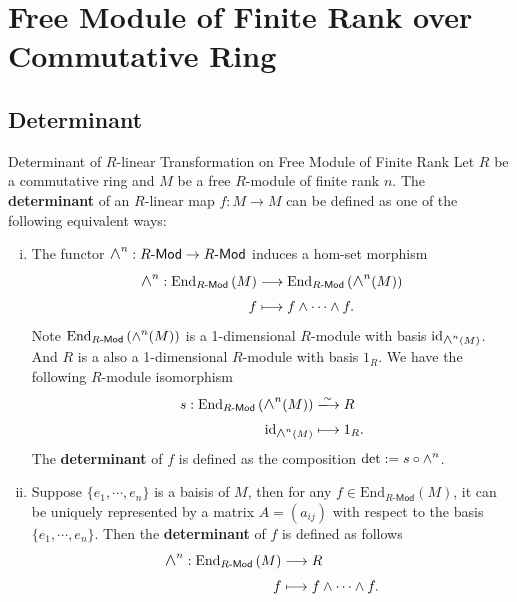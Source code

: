 \section{Free Module of Finite Rank over Commutative Ring}
\subsection{Determinant}

\begin{definition}{Determinant of $R$-linear Transformation on Free Module of Finite Rank}{}
    Let $R$ be a commutative ring and $M$ be a free $R$-module of finite rank $n$. The \textbf{determinant} of an $R$-linear map $f:M\to M$ can be defined as one of the following equivalent ways:
    \begin{enumerate}[(i)]
        \item The functor $\Largewedge^n:R\text{-}\mathsf{Mod}\to R\text{-}\mathsf{Mod}$ induces a hom-set morphism 
        \begin{align*}
            \largewedge^n:\mathrm{End}_{R\text{-}\mathsf{Mod}}\left(M\right) &\longrightarrow\mathrm{End}_{R\text{-}\mathsf{Mod}}\left(\largewedge^n(M)\right)\\
        f &\longmapsto f\wedge\cdots\wedge f.
        \end{align*}
        Note $\mathrm{End}_{R\text{-}\mathsf{Mod}}\left(\largewedge^n(M)\right)$ is a 1-dimensional $R$-module with basis $\mathrm{id}_{\largewedge^n(M)}$. And $R$ is a also a 1-dimensional $R$-module with basis $1_R$. We have the following $R$-module isomorphism
        \begin{align*}
            s:\mathrm{End}_{R\text{-}\mathsf{Mod}}\left(\largewedge^n(M)\right)&\xlongrightarrow{\sim} R\\
            \mathrm{id}_{\largewedge^n(M)} &\longmapsto 1_R.
        \end{align*}
        The \textbf{determinant} of $f$ is defined as the composition $\det:=s\circ \largewedge^n$.
        \item Suppose $\{e_1,\cdots,e_n\}$ is a baisis of $M$, then for any $f\in \mathrm{End}_{R\text{-}\mathsf{Mod}}\left(M\right)$, it can be uniquely represented by a matrix $A=(a_{ij})$ with respect to the basis $\{e_1,\cdots,e_n\}$. Then the \textbf{determinant} of $f$ is defined as follows
        \begin{align*}
            \largewedge^n:\mathrm{End}_{R\text{-}\mathsf{Mod}}\left(M\right) &\longrightarrow R\\
        f &\longmapsto f\wedge\cdots\wedge f.
        \end{align*}
    \end{enumerate}
\end{definition}


